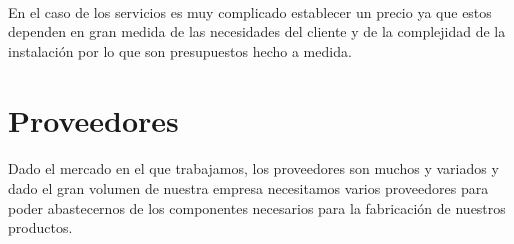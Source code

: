 \documentclass{report}
\begin{document}
        \paragraph*{}{
          En el caso de los servicios es muy complicado establecer un precio ya que estos dependen en gran medida de las necesidades del cliente y de la complejidad de la instalación por lo que son presupuestos hecho a medida.
          }
      \clearpage\section{Proveedores}
        \paragraph*{}{
          Dado el mercado en el que trabajamos, los proveedores son muchos y variados y dado el gran volumen de nuestra empresa necesitamos varios proveedores para poder abastecernos de los componentes necesarios para la fabricación de nuestros productos.
        }
\end{document}
